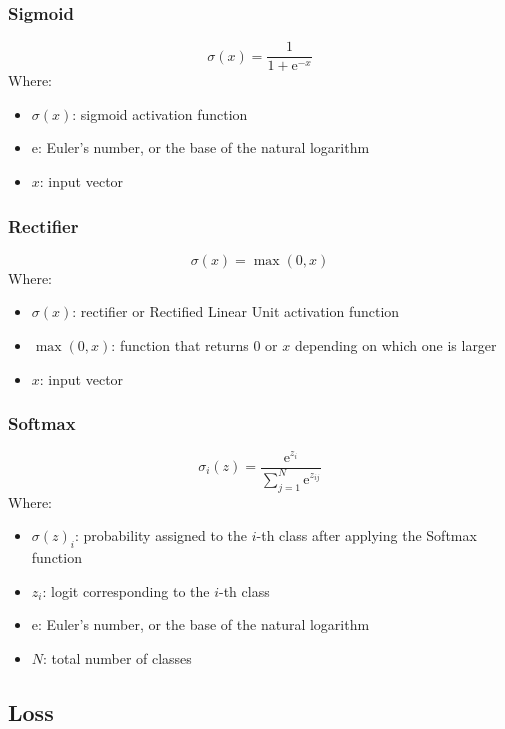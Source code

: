 \documentclass[a4paper]{article}
\newcommand{\euler}{\mathrm{e}}
\begin{document}
\subsubsection*{Sigmoid}
\begin{equation*}
    \sigma(x) = \frac{1}{1+\euler^{-x}}
\end{equation*}
Where:
\begin{itemize}
    \item $\sigma(x)$: sigmoid activation function
    \item $\euler$: Euler's number, or the base of the natural logarithm
    \item $x$: input vector
\end{itemize}

\subsubsection*{Rectifier}
\begin{equation*}
    \sigma(x) = \max(0,x)
\end{equation*}
Where:
\begin{itemize}
    \item $\sigma(x)$: rectifier or Rectified Linear Unit activation function
    \item $\max(0,x)$: function that returns 0 or $x$ depending on which one is larger
    \item $x$: input vector
\end{itemize}

\subsubsection*{Softmax}
\begin{equation*}
    \sigma_i(z) = \frac{\euler^{z_i}}{\sum_{j=1}^{N} \euler^{z_{ij}}}
\end{equation*}
Where:
\begin{itemize}
    \item $\sigma(z)_i$: probability assigned to the $i$-th class after applying the Softmax function
    \item $z_i$: logit corresponding to the $i$-th class
    \item $\euler$: Euler's number, or the base of the natural logarithm
    \item $N$: total number of classes
\end{itemize}

\subsection*{Loss}
\end{document}
